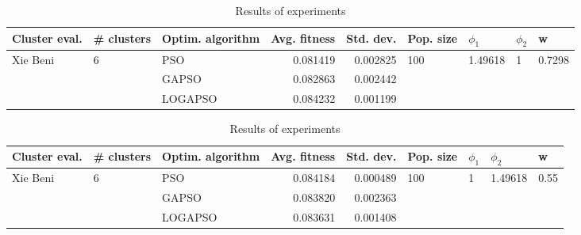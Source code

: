 \documentclass{article}
\begin{document}
\begin{table}
\centering
\caption{Results of experiments}
\begin{tabular}{lllrrllll}
\toprule
            Cluster eval. &        \# clusters & Optim. algorithm &  Avg. fitness &  Std. dev. &            Pop. size &               $\phi_{1}$ &         $\phi_{2}$ &                       w \\
\midrule
\multirow{3}{*}{Xie Beni} & \multirow{3}{*}{6} &              PSO &      0.081419 &   0.002825 & \multirow{3}{*}{100} & \multirow{3}{*}{1.49618} & \multirow{3}{*}{1} & \multirow{3}{*}{0.7298} \\
                          &                    &            GAPSO &      0.082863 &   0.002442 &                      &                          &                    &                         \\
                          &                    &          LOGAPSO &      0.084232 &   0.001199 &                      &                          &                    &                         \\
\bottomrule
\end{tabular}
\end{table}
\begin{table}
\centering
\caption{Results of experiments}
\begin{tabular}{lllrrllll}
\toprule
            Cluster eval. &        \# clusters & Optim. algorithm &  Avg. fitness &  Std. dev. &            Pop. size &         $\phi_{1}$ &               $\phi_{2}$ &                     w \\
\midrule
\multirow{3}{*}{Xie Beni} & \multirow{3}{*}{6} &              PSO &      0.084184 &   0.000489 & \multirow{3}{*}{100} & \multirow{3}{*}{1} & \multirow{3}{*}{1.49618} & \multirow{3}{*}{0.55} \\
                          &                    &            GAPSO &      0.083820 &   0.002363 &                      &                    &                          &                       \\
                          &                    &          LOGAPSO &      0.083631 &   0.001408 &                      &                    &                          &                       \\
\bottomrule
\end{tabular}
\end{table}
\end{document}

